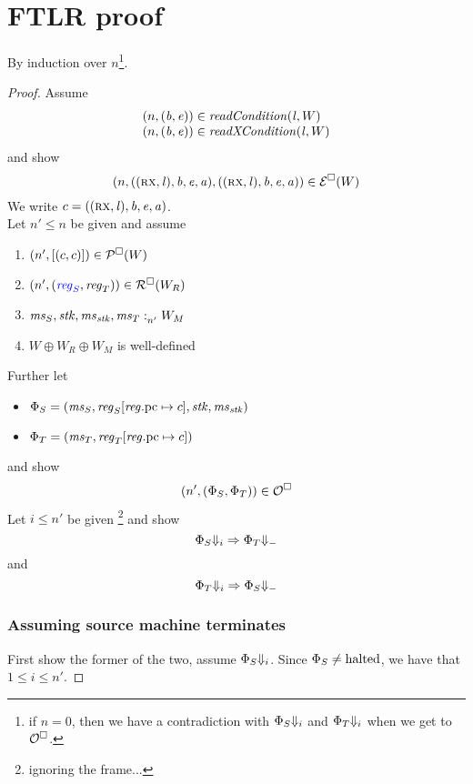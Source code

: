 \documentclass[a4paper]{article}
\begin{document}
\section{FTLR proof}
By induction over $n$\footnote{if $n=0$, then we have a contradiction with $\Phi_S\term[i]$ and $\Phi_T\term[i]$ when we get to $\lro$.}.
\begin{proof}
  Assume
\[
  \begin{array}{l}
  \npair{(\baddr,\eaddr)}\in \readCond{\lin,W}\\
  \npair{(\baddr,\eaddr)}\in \xReadCond{\lin,W}
  \end{array}
\]
and show
\[
\npair{((\rx,\lin),\baddr,\eaddr,\aaddr),
       ((\rx,\lin),\baddr,\eaddr,\aaddr)} \in \lre(W)
\]
We write $c=((\rx,\lin),\baddr,\eaddr,\aaddr)$.\\

Let $n' \leq n$ be given and assume
\begin{enumerate}
\item $\npair[n']{[(c,c)]} \in \lrp(W)$ 
\item $\npair[n']{\stpair{\reg}{\reg}} \in \lrr(W_R)$ \label{item:reg-ass}
\item $\memSat[n']{\ms_S,\stk,\ms_\stk,\ms_T}{W_M}$\label{item:mem-ass}
\item $W \oplus W_R \oplus W_M$ is well-defined\label{item:worlds-def}
\end{enumerate}
Further let
\begin{itemize}
\item $\Phi_S = (\ms_S,\reg_S\updReg{\pcreg}{c},\stk,\ms_\stk)$
\item $\Phi_T = (\ms_T,\reg_T\updReg{\pcreg}{c})$
\end{itemize}
and show
\[
  \npair[n']{(\Phi_S,\Phi_T)} \in \lro
\]
Let $i \leq n'$ be given \footnote{ignoring the frame...} and show
\[
  \Phi_S \term[i] \Rightarrow \Phi_T \term
\]
and 
\[
  \Phi_T \term[i] \Rightarrow \Phi_S \term
\]

\subsubsection*{Assuming source machine terminates}
First show the former of the two, assume $\Phi_S\term[i]$.
Since $\Phi_S \neq \halted$, we have that $1 \leq i \leq n'$.


\end{proof}
\end{document}
